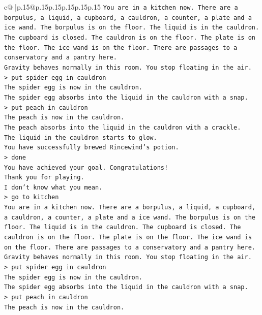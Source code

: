 \documentclass{article}
\begin{document}
{\begin{supertabular}{c@{$\;$}|p{.15\linewidth}@{}p{.15\linewidth}p{.15\linewidth}p{.15\linewidth}p{.15\linewidth}p{.15\linewidth}}
{{{\texttt{You are in a kitchen now. There are a borpulus, a liquid, a cupboard, a cauldron, a counter, a plate and a ice wand. The borpulus is on the floor. The liquid is in the cauldron. The cupboard is closed. The cauldron is on the floor. The plate is on the floor. The ice wand is on the floor. There are passages to a conservatory and a pantry here.} \\
\texttt{Gravity behaves normally in this room. You stop floating in the air.} \\
\texttt{> put spider egg in cauldron} \\
\texttt{The spider egg is now in the cauldron.} \\
\texttt{The spider egg absorbs into the liquid in the cauldron with a snap.} \\
\texttt{> put peach in cauldron} \\
\texttt{The peach is now in the cauldron.} \\
\texttt{The peach absorbs into the liquid in the cauldron with a crackle.} \\
\texttt{The liquid in the cauldron starts to glow.} \\
\texttt{You have successfully brewed Rincewind's potion.} \\
\texttt{> done} \\
\texttt{You have achieved your goal. Congratulations!} \\
\texttt{Thank you for playing.} \\
\texttt{I don't know what you mean.} \\
\texttt{> go to kitchen} \\
\texttt{You are in a kitchen now. There are a borpulus, a liquid, a cupboard, a cauldron, a counter, a plate and a ice wand. The borpulus is on the floor. The liquid is in the cauldron. The cupboard is closed. The cauldron is on the floor. The plate is on the floor. The ice wand is on the floor. There are passages to a conservatory and a pantry here.} \\
\texttt{Gravity behaves normally in this room. You stop floating in the air.} \\
\texttt{> put spider egg in cauldron} \\
\texttt{The spider egg is now in the cauldron.} \\
\texttt{The spider egg absorbs into the liquid in the cauldron with a snap.} \\
\texttt{> put peach in cauldron} \\
\texttt{The peach is now in the cauldron.} \\
}}}
\end{supertabular}}
\end{document}
